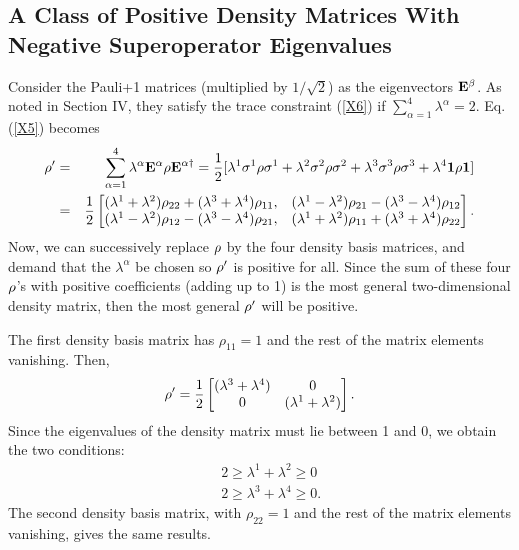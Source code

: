 \documentclass[aps,pra,amssymb, amsfonts,amsmath,showpacs, superscriptaddress,12pt]{revtex4}
\begin{document}
 \begin{appendix}
 \section{A Class of Positive Density Matrices With Negative Superoperator Eigenvalues}\label{A}
 Consider  the Pauli+1 matrices (multiplied by $1/\sqrt{2}$) as the eigenvectors ${\bf E}^{\beta}$. As noted in Section IV, they satisfy the trace constraint (\ref{X6}) if $\sum_{\alpha=1}^{4}\lambda^{\alpha}=2$. 
  Eq.(\ref{X5}) becomes 
\begin{eqnarray}\label{A1}
{\bf \rho}'
&=&\sum_{\alpha=1}^{4}\lambda^{\alpha}{\bf E}^{\alpha}{\bf\rho} {\bf E}^{\alpha\dagger} = \frac{1}{2}[\lambda^{1}{\bf \sigma}^{1}{\bf\rho} {\bf \sigma}^{1}+\lambda^{2}{\bf \sigma}^{2}{\bf\rho} {\bf \sigma}^{2}+\lambda^{3}{\bf \sigma}^{3}{\bf\rho} {\bf \sigma}^{3}+\lambda^{4}{\bf1}{\bf\rho} {\bf 1}]\nonumber\\
&=&\frac{1}{2}\begin{bmatrix}(\lambda^{1}+\lambda^{2})\rho_{22}+(\lambda^{3}+\lambda^{4})\rho_{11},&(\lambda^{1}-\lambda^{2})\rho_{21}-(\lambda^{3}-\lambda^{4})\rho_{12}
\\(\lambda^{1}-\lambda^{2})\rho_{12}-(\lambda^{3}-\lambda^{4})\rho_{21},&(\lambda^{1}+\lambda^{2})\rho_{11}+(\lambda^{3}+\lambda^{4})\rho_{22}
\end{bmatrix}.\nonumber\\
\end{eqnarray}
\noindent 
 \noindent Now, we can successively replace ${\bf \rho}$  by the four density basis matrices, and demand that the $\lambda^{\alpha}$ be chosen so ${\bf \rho}'$ is positive for all. Since the sum of these four ${\bf \rho}$'s with positive coefficients (adding up to 1) is the  most general two-dimensional density matrix, then the most general ${\bf \rho}'$ will be positive. 
 
 The first density basis matrix has $\rho_{11}=1$ and the rest of the matrix elements vanishing. Then, 
 \begin{equation}\label{A2}
{\bf \rho}'
=\frac{1}{2}\begin{bmatrix}(\lambda^{3}+\lambda^{4})&0
\\0&(\lambda^{1}+\lambda^{2})
\end{bmatrix}.
\end{equation}
Since the eigenvalues of the density matrix must lie between 1 and 0,  we obtain the two conditions:
 \begin{subequations}\label{A3}
 \begin{eqnarray}
&&2\geq\lambda^{1}+\lambda^{2}\geq 0\label{A3a}\\
&&2\geq\lambda^{3}+\lambda^{4}\geq 0.\label{A3b}
\end{eqnarray}
\end{subequations}
\noindent The second density basis matrix,  with $\rho_{22}=1$ and the rest of the matrix elements vanishing, gives the same results.


\end{appendix}
\end{document}
